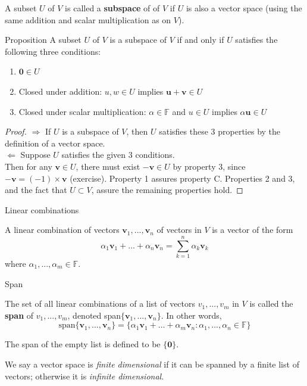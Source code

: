 \documentclass [aspectratio=169]{beamer}
\newcommand{\bu}{{\mathbf{u}}}
\newcommand{\bv}{{\mathbf{v}}}
\newcommand{\zerovec}{{\mathbf{0}}}
\newcommand{\F}{{\mathds{F}}}
\begin{document}
\begin{frame}

\begin{definition}
A subset $U$ of $V$ is called a \textbf{subspace} of of $V$ if $U$ is also a vector space (using the same addition and scalar multiplication as on $V$).
\end{definition}


\begin{exampleblock}{Proposition}
A subset $U$ of $V$ is a subspace of $V$ if
and only if $U$ satisfies the following three conditions:
\begin{enumerate}
\item  $\zerovec \in U$
\item Closed under addition: $u,w\in U$ implies $\bu+\bv \in U$
\item Closed under scalar multiplication: $\alpha \in\F$ and $u\in U$
implies $\alpha \bu \in U$
\end{enumerate}
\end{exampleblock}
\end{frame}

\begin{frame}
\begin{proof}
$\Rightarrow$ If $U$ is a subspace of $V$, then $U$ satisfies these 3 properties by the definition of a vector space. \\
$\Leftarrow$ Suppose $U$ satisfies the given 3 conditions. \\
Then for any $\bv \in U$, there must exist $-\bv \in U$ by property 3, since $-\bv = (-1) \times \bv$ (exercise). Property 1 assures property C. Properties 2 and 3, and the fact that $U \subset V$, assure the remaining properties hold. 
\end{proof}
\end{frame}

\begin{frame}{Linear combinations}
\begin{definition}
A linear combination of vectors $\bv_{1},...,\bv_{n}$ of vectors in $V$ is a vector of the form 
$$
\alpha_{1}\bv_{1}+...+\alpha_{n}\bv_{n} = \sum_{k=1}^n \alpha_k \bv_k
$$
 where $\alpha_{1},...,\alpha_{m} \in \F$.
\end{definition}
\end{frame}

\begin{frame}{Span}
\begin{definition}
The set of all linear combinations of a list of vectors
$v_{1},...,v_{m}$ in $V$ is called the \textbf{span} of $v_{1},...,v_{m}$,
denoted span$\{\bv_{1},...,\bv_{n}\}$. In other words, 
$$
\text{span}\{\bv_{1},...,\bv_{n}\}=\{\alpha_{1}\bv_{1}+...+\alpha_{m}\bv_{n} :\alpha_{1},...,\alpha_{n}\in\F\}
$$
\end{definition}
The span of the empty list is defined to be $\{\zerovec\}$.

\vspace{1em}
We say a vector space is \emph{finite dimensional} if it can be spanned by a finite list of vectors; otherwise it is \emph{infinite dimensional}.

\end{frame}
\end{document}
